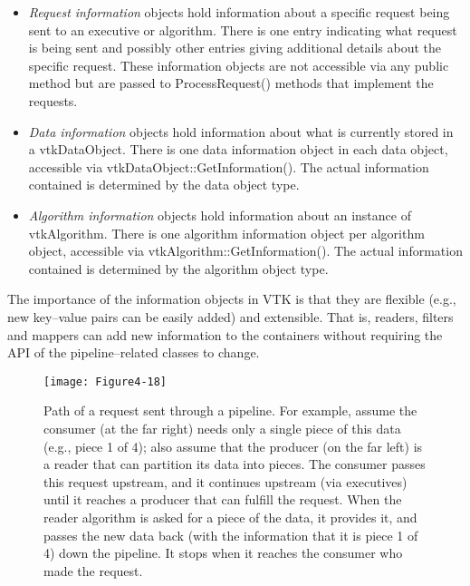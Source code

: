 \begin{description}[leftmargin=0cm,labelindent=0cm]
\begin{itemize}
\item \emph{Request information} objects hold information about a specific request being sent to an executive or algorithm. There is one entry indicating what request is being sent and possibly other entries giving additional details about the specific request. These information objects are not accessible via any public method but are passed to ProcessRequest() methods that implement the requests.

\item \emph{Data information} objects hold information about what is currently stored in a vtkDataObject. There is one data information object in each data object, accessible via vtkDataObject::GetInformation(). The actual information contained is determined by the data object type.

\item \emph{Algorithm information} objects hold information about an instance of vtkAlgorithm. There is one algorithm information object per algorithm object, accessible via vtkAlgorithm::GetInformation(). The actual information contained is determined by the algorithm object type.
\end{itemize}

The importance of the information objects in VTK is that they are flexible (e.g., new key--value pairs can be easily added) and extensible. That is, readers, filters and mappers can add new information to the containers without requiring the API of the pipeline--related classes to change.

\begin{figure}[!htb]
  \centering
  \texttt{[image: Figure4-18]}\\
  \caption{Path of a request sent through a pipeline. For example, assume the consumer (at the far right) needs only a single piece of this data (e.g., piece 1 of 4); also assume that the producer (on the far left) is a reader that can partition its data into pieces. The consumer passes this request upstream, and it continues upstream (via executives) until it reaches a producer that can fulfill the request. When the reader algorithm is asked for a piece of the data, it provides it, and passes the new data back (with the information that it is piece 1 of 4) down the pipeline. It stops when it reaches the consumer who made the request.}\label{fig:Figure4-18}
\end{figure}


\end{description}
